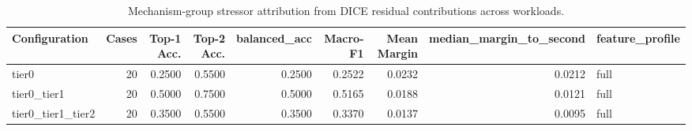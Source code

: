 \begin{table}[t]
\centering
\caption{Mechanism-group stressor attribution from DICE residual contributions across workloads.}
\label{tab:dice_stressor_diagnosis}
\footnotesize
\begin{tabular}{lrrrrrrrl}
\toprule
Configuration & Cases & Top-1 Acc. & Top-2 Acc. & balanced_acc & Macro-F1 & Mean Margin & median_margin_to_second & feature_profile \\
\midrule
tier0 & 20 & 0.2500 & 0.5500 & 0.2500 & 0.2522 & 0.0232 & 0.0212 & full \\
tier0_tier1 & 20 & 0.5000 & 0.7500 & 0.5000 & 0.5165 & 0.0188 & 0.0121 & full \\
tier0_tier1_tier2 & 20 & 0.3500 & 0.5500 & 0.3500 & 0.3370 & 0.0137 & 0.0095 & full \\
\bottomrule
\end{tabular}

\end{table}
